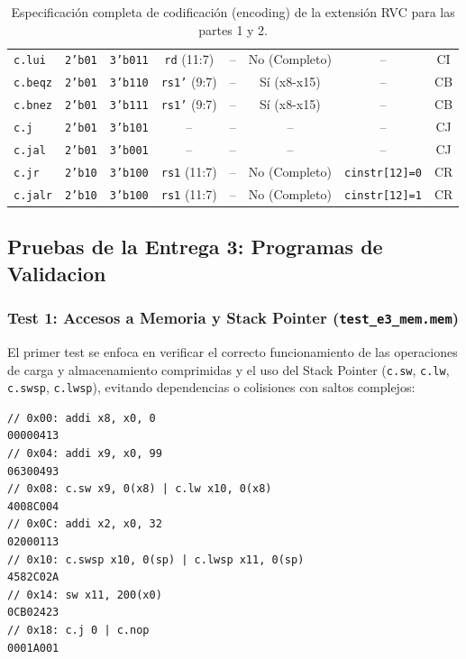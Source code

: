 \documentclass[12pt, a4paper]{article}
\begin{document}
\begin{table}[H]
{\begin{tabular}{l|c|c|c|c|c|c|c}
\texttt{c.lui} & \texttt{2'b01} & \texttt{3'b011} & \texttt{rd} (11:7) & -- & No (Completo) & -- & CI \\
\texttt{c.beqz} & \texttt{2'b01} & \texttt{3'b110} & \texttt{rs1'} (9:7) & -- & Sí (x8-x15) & -- & CB \\
\texttt{c.bnez} & \texttt{2'b01} & \texttt{3'b111} & \texttt{rs1'} (9:7) & -- & Sí (x8-x15) & -- & CB \\
\texttt{c.j} & \texttt{2'b01} & \texttt{3'b101} & -- & -- & -- & -- & CJ \\
\texttt{c.jal} & \texttt{2'b01} & \texttt{3'b001} & -- & -- & -- & -- & CJ \\
\texttt{c.jr} & \texttt{2'b10} & \texttt{3'b100} & \texttt{rs1} (11:7) & -- & No (Completo) & \texttt{cinstr[12]=0} & CR \\
\texttt{c.jalr} & \texttt{2'b10} & \texttt{3'b100} & \texttt{rs1} (11:7) & -- & No (Completo) & \texttt{cinstr[12]=1} & CR \\
\bottomrule
\end{tabular}%
}
\caption{Especificación completa de codificación (encoding) de la extensión RVC para las partes 1 y 2.}
\label{tab:encodings}
\end{table}

\subsection{Pruebas de la Entrega 3: Programas de Validacion}

\subsubsection{Test 1: Accesos a Memoria y Stack Pointer (\texttt{test\_e3\_mem.mem})}
El primer test se enfoca en verificar el correcto funcionamiento de las operaciones de carga y almacenamiento comprimidas y el uso del Stack Pointer (\texttt{c.sw}, \texttt{c.lw}, \texttt{c.swsp}, \texttt{c.lwsp}), evitando dependencias o colisiones con saltos complejos:

\begin{lstlisting}[style=verilogstyle, caption={Programa de Prueba de Memoria y Pila: test\_e3\_mem.mem}]
// 0x00: addi x8, x0, 0
00000413
// 0x04: addi x9, x0, 99
06300493
// 0x08: c.sw x9, 0(x8) | c.lw x10, 0(x8)
4008C004
// 0x0C: addi x2, x0, 32
02000113
// 0x10: c.swsp x10, 0(sp) | c.lwsp x11, 0(sp)
4582C02A
// 0x14: sw x11, 200(x0)
0CB02423
// 0x18: c.j 0 | c.nop
0001A001
\end{lstlisting}
\end{document}
